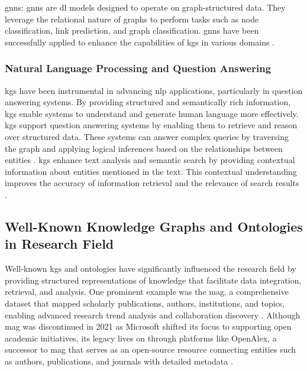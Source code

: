 \glspl{gnn}: \glspl{gnn} are \gls{dl} models designed to operate on graph-structured data. They leverage the relational nature of graphs to perform tasks such as node classification, link prediction, and graph classification. \glspl{gnn} have been successfully applied to enhance the capabilities of \glspl{kg} in various domains \cite{Wu2021}.

\subsubsection*{Natural Language Processing and Question Answering}
\glspl{kg} have been instrumental in advancing \gls{nlp} applications, particularly in question answering systems. By providing structured and semantically rich information, \glspl{kg} enable systems to understand and generate human language more effectively.
\glspl{kg} support question answering systems by enabling them to retrieve and reason over structured data.
These systems can answer complex queries by traversing the graph and applying logical inferences based on the relationships between entities \cite{Yasunaga2021}.
\glspl{kg} enhance text analysis and semantic search by providing contextual information about entities mentioned in the text.
This contextual understanding improves the accuracy of information retrieval and the relevance of search results \cite{Fernandez2011}.

\subsection*{Well-Known Knowledge Graphs and Ontologies in Research Field}
Well-known \glspl{kg} and ontologies have significantly influenced the research field by providing structured representations of knowledge that facilitate data integration, retrieval, and analysis.
One prominent example was the \gls{mag}, a comprehensive dataset that mapped scholarly publications, authors, institutions, and topics, enabling advanced research trend analysis and collaboration discovery \cite{Wang2020}.
Although \gls{mag} was discontinued in 2021 as Microsoft shifted its focus to supporting open academic initiatives, its legacy lives on through platforms like OpenAlex, a successor to \gls{mag} that serves as an open-source resource connecting entities such as authors, publications, and journals with detailed metadata \cite{priem2022}.

